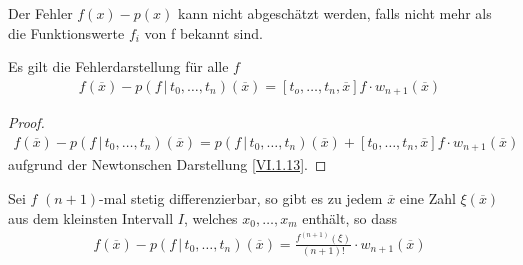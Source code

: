 Der Fehler $f(x) -p(x) $ kann nicht abgeschätzt werden,
falls nicht mehr als die Funktionswerte $f_i$ von f bekannt sind.

\begin{Satze}
  Es gilt die Fehlerdarstellung für alle $f$
  \begin{gather}
    f(\overline{x})-p(f\,|\,t_0,\dots, t_n)(\overline{x})
    = [t_o,\dots,t_n,\overline{x}]f\cdot w_{n+1}(\overline{x})
    \label{VI.1.22}
  \end{gather}
\end{Satze}

\begin{proof}
  \begin{gather*}
    f(\overline{x})- p(f\,|\,t_0,\dots, t_n)(\overline{x})
    = p(f\,|\, t_0,\dots, t_n)(\overline{x})
    + [t_0,\dots, t_n,\overline{x}]f\cdot w_{n+1}(\overline{x})
  \end{gather*}
  aufgrund der Newtonschen Darstellung \eqref{VI.1.13}.
\end{proof}


\begin{Satze}[Restglieddarstellung]
  Sei $f$ $(n+1)$-mal stetig differenzierbar,
  so gibt es zu jedem $\overline{x}$ eine Zahl $\xi(\overline{x})$
  aus dem kleinsten Intervall $I$, welches $x_0,\dots, x_m$ enthält,
  so dass 
  \begin{gather}
    f(\overline{x})-p(f\,|\,t_0,\dots,t_n)(\overline{x})
    = \frac{f^{(n+1)}(\xi)}{(n+1)!}\cdot w_{n+1}(\overline{x})
    \label{VI.1.21}
  \end{gather}
\end{Satze}

